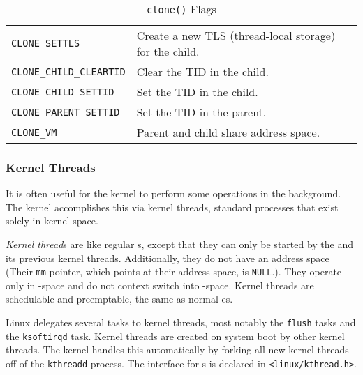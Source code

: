 \begin{table}[h!tbp]
\begin{tabular}{ll}
    \texttt{CLONE_SETTLS} & Create a new TLS (thread-local storage) for the child. \\
    \texttt{CLONE_CHILD_CLEARTID} & Clear the TID in the child. \\
    \texttt{CLONE_CHILD_SETTID} & Set the TID in the child. \\
    \texttt{CLONE_PARENT_SETTID} & Set the TID in the parent. \\
    \texttt{CLONE_VM} & Parent and child share address space. \\
    \bottomrule
  \end{tabular}
  \caption{\texttt{clone()} Flags}
  \label{tab:Clone_Flags}
\end{table}

\subsubsection{Kernel Threads}\label{subsubsec:Kernel_Threads}
It is often useful for the kernel to perform some operations in the background.
The kernel accomplishes this via kernel threads, standard processes that exist solely in kernel-space.

\begin{definition}\label{def:Kernel_Thread}
  \emph{Kernel thread}s are like regular s, except that they can only be started by the  and its previous kernel threads.
  Additionally, they do not have an address space (Their \texttt{mm} pointer, which points at their address space, is \texttt{NULL}.).
  They operate only in -space and do not context switch into -space.
  Kernel threads are schedulable and preemptable, the same as normal es.
\end{definition}

Linux delegates several tasks to kernel threads, most notably the \texttt{flush} tasks and the \texttt{ksoftirqd} task.
Kernel threads are created on system boot by other kernel threads.
The kernel handles this automatically by forking all new kernel threads off of the \texttt{kthreadd}  process.
The interface for s is declared in \texttt{<linux/kthread.h>}.


